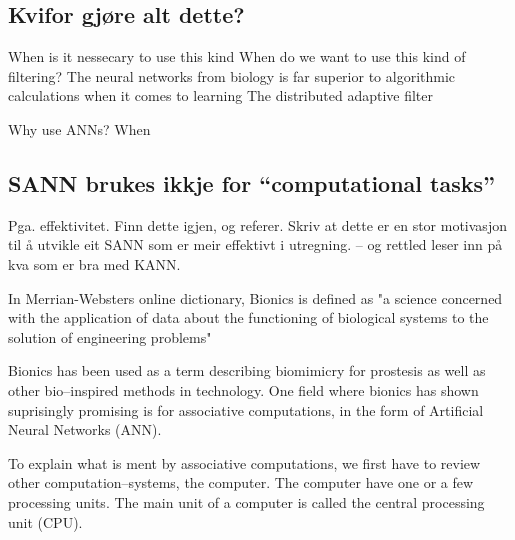 	\subsection{Kvifor gjøre alt dette?}
	When is it nessecary to use this kind
	When do we want to use this kind of filtering?
	The neural networks from biology is far superior to algorithmic calculations when it comes to learning
	The distributed adaptive filter 

	Why use ANNs? 
	When 



	\subsection{SANN brukes ikkje for ``computational tasks''}
	Pga. effektivitet. Finn dette igjen, og referer. Skriv at dette er en stor motivasjon til å utvikle eit SANN som er meir effektivt i utregning.
	-- og rettled leser inn på kva som er bra med KANN.
















In Merrian-Websters online dictionary, Bionics is defined as 
"a science concerned with the application of data about the functioning of biological systems to the solution of engineering problems"

Bionics has been used as a term describing biomimicry for prostesis as well as other bio--inspired methods in technology.
One field where bionics has shown suprisingly promising is for associative computations, in the form of Artificial Neural Networks (ANN).

To explain what is ment by associative computations, we first have to review other computation--systems, the computer.
The computer have one or a few processing units. The main unit of a computer is called the central processing unit (CPU).

